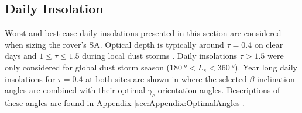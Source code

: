 \subsection{Daily Insolation}
Worst and best case daily insolations presented in this section are considered when sizing the rover's \ac{SA}. Optical depth is typically around $\tau = 0.4$ on clear days  and $1 \leq \tau \leq 1.5$ during local dust storms . Daily insolations $\tau > 1.5$ were only considered for global dust storm season ($\SI{180}{\degree} < L_{s} < \SI{360}{\degree}$). Year long daily insolations for $\tau = 0.4$ at both sites are shown in  where the selected $\beta$ inclination angles are combined with their optimal $\gamma_c$ orientation angles. Descriptions of these angles are found in Appendix \ref{sec:Appendix:OptimalAngles}.

